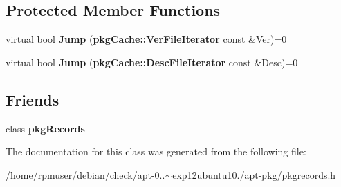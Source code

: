 \subsection*{\-Protected \-Member \-Functions}
\begin{DoxyCompactItemize}
\item 
virtual bool {\bfseries \-Jump} ({\bf pkg\-Cache\-::\-Ver\-File\-Iterator} const \&\-Ver)=0\label{classpkgRecords_1_1Parser_a9f0c1e8ff44907dc3be122ec79a9b065}

\item 
virtual bool {\bfseries \-Jump} ({\bf pkg\-Cache\-::\-Desc\-File\-Iterator} const \&\-Desc)=0\label{classpkgRecords_1_1Parser_a89cc4b15a6c632606210959abe4e5616}

\end{DoxyCompactItemize}
\subsection*{\-Friends}
\begin{DoxyCompactItemize}
\item 
class {\bfseries pkg\-Records}\label{classpkgRecords_1_1Parser_a6b8e28f8652e835e8991366a1897d061}

\end{DoxyCompactItemize}


\-The documentation for this class was generated from the following file\-:\begin{DoxyCompactItemize}
\item 
/home/rpmuser/debian/check/apt-\/0..$\sim$exp12ubuntu10./apt-\/pkg/pkgrecords.\-h\end{DoxyCompactItemize}
